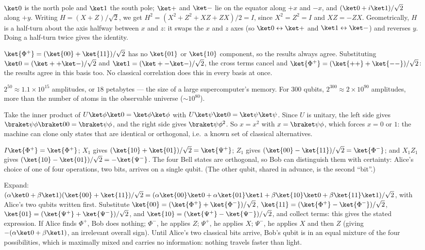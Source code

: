 
 $\ket0$ is the north pole and $\ket1$ the south pole; $\ket+$ and $\ket-$ lie on the equator along $+x$ and $-x$, and $(\ket0+i\ket1)/\sqrt2$ along $+y$. Writing $H = (X+Z)/\sqrt2$, we get $H^2 = (X^2 + Z^2 + XZ + ZX)/2 = I$, since $X^2 = Z^2 = I$ and $XZ = -ZX$. Geometrically, $H$ is a half-turn about the axis halfway between $x$ and $z$: it swaps the $x$ and $z$ axes (so $\ket0\leftrightarrow\ket+$ and $\ket1\leftrightarrow\ket-$) and reverses $y$. Doing a half-turn twice gives the identity.

 $\ket{\Phi^+} = (\ket{00}+\ket{11})/\sqrt2$ has no $\ket{01}$ or $\ket{10}$ component, so the results always agree. Substituting $\ket0 = (\ket++\ket-)/\sqrt2$ and $\ket1 = (\ket+-\ket-)/\sqrt2$, the cross terms cancel and $\ket{\Phi^+} = (\ket{++}+\ket{--})/\sqrt2$: the results agree in this basis too. No classical correlation does this in every basis at once.

 $2^{50}\approx1.1\times10^{15}$ amplitudes, or $18$ petabytes --- the size of a large supercomputer's memory. For $300$ qubits, $2^{300}\approx2\times10^{90}$ amplitudes, more than the number of atoms in the observable universe ($\sim10^{80}$).

 Take the inner product of $U\ket\phi\ket0 = \ket\phi\ket\phi$ with $U\ket\psi\ket0 = \ket\psi\ket\psi$. Since $U$ is unitary, the left side gives $\braket\psi\phi\braket00 = \braket\psi\phi$, and the right side gives $\braket\psi\phi^2$. So $x = x^2$ with $x = \braket\psi\phi$, which forces $x = 0$ or $1$: the machine can clone only states that are identical or orthogonal, i.e.\ a known set of classical alternatives.

 $I\ket{\Phi^+} = \ket{\Phi^+}$; $X_1$ gives $(\ket{10}+\ket{01})/\sqrt2 = \ket{\Psi^+}$; $Z_1$ gives $(\ket{00}-\ket{11})/\sqrt2 = \ket{\Phi^-}$; and $X_1Z_1$ gives $(\ket{10}-\ket{01})/\sqrt2 = -\ket{\Psi^-}$. The four Bell states are orthogonal, so Bob can distinguish them with certainty: Alice's choice of one of four operations, two bits, arrives on a single qubit. (The other qubit, shared in advance, is the second ``bit''.)

 Expand: $(\alpha\ket0+\beta\ket1)(\ket{00}+\ket{11})/\sqrt2 = (\alpha\ket{00}\ket0 + \alpha\ket{01}\ket1 + \beta\ket{10}\ket0 + \beta\ket{11}\ket1)/\sqrt2$, with Alice's two qubits written first. Substitute $\ket{00} = (\ket{\Phi^+}+\ket{\Phi^-})/\sqrt2$, $\ket{11} = (\ket{\Phi^+}-\ket{\Phi^-})/\sqrt2$, $\ket{01} = (\ket{\Psi^+}+\ket{\Psi^-})/\sqrt2$, and $\ket{10} = (\ket{\Psi^+}-\ket{\Psi^-})/\sqrt2$, and collect terms: this gives the stated expression. If Alice finds $\Phi^+$, Bob does nothing; $\Phi^-$, he applies $Z$; $\Psi^+$, he applies $X$; $\Psi^-$, he applies $X$ and then $Z$ (giving $-(\alpha\ket0+\beta\ket1)$, an irrelevant overall sign). Until Alice's two classical bits arrive, Bob's qubit is in an equal mixture of the four possibilities, which is maximally mixed and carries no information: nothing travels faster than light.

